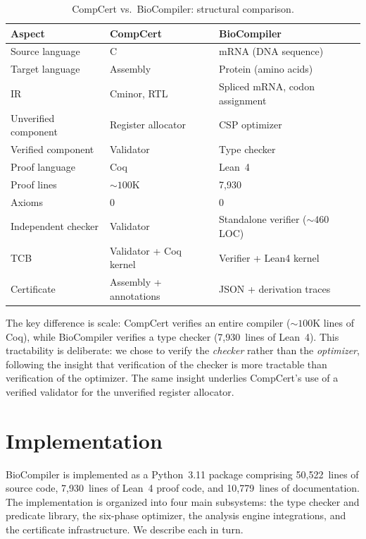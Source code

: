 \documentclass[acmsmall,review,anonymous]{acmart}
\begin{document}
\begin{table}[t]
\centering
\caption{CompCert vs.\ BioCompiler: structural comparison.}
\label{tab:compcert}
\begin{tabular}{lll}
\toprule
\textbf{Aspect} & \textbf{CompCert} & \textbf{BioCompiler} \\
\midrule
Source language & C & mRNA (DNA sequence) \\
Target language & Assembly & Protein (amino acids) \\
IR & Cminor, RTL & Spliced mRNA, codon assignment \\
Unverified component & Register allocator & CSP optimizer \\
Verified component & Validator & Type checker \\
Proof language & Coq & Lean~4 \\
Proof lines & ${\sim}100$K & 7{,}930 \\
Axioms & 0 & 0 \\
Independent checker & Validator & Standalone verifier (${\sim}460$ LOC) \\
TCB & Validator + Coq kernel & Verifier + Lean4 kernel \\
Certificate & Assembly + annotations & JSON + derivation traces \\
\bottomrule
\end{tabular}
\end{table}

The key difference is scale: CompCert verifies an entire compiler
(${\sim}100$K lines of Coq), while BioCompiler verifies a type checker
(7{,}930~lines of Lean~4).
This tractability is deliberate: we chose to verify the \emph{checker}
rather than the \emph{optimizer}, following the insight that
verification of the checker is more tractable than verification of the
optimizer.
The same insight underlies CompCert's use of a verified validator for
the unverified register allocator.




\section{Implementation}\label{sec:impl}

BioCompiler is implemented as a Python~3.11 package comprising
50,522~lines of source code, 7,930~lines of Lean~4 proof code, and
10,779~lines of documentation.  The implementation is organized into four
main subsystems: the type checker and predicate library, the six-phase
optimizer, the analysis engine integrations, and the certificate
infrastructure.  We describe each in turn.
\end{document}
